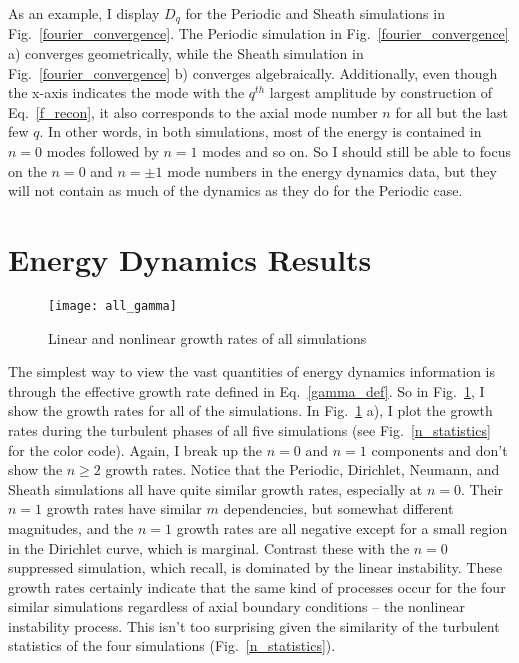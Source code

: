 As an example, I display $D_q$ for the Periodic and Sheath simulations in Fig.~\ref{fourier_convergence}. The Periodic simulation in Fig.~\ref{fourier_convergence} a) converges geometrically,
while the Sheath simulation in Fig.~\ref{fourier_convergence} b) converges algebraically. Additionally, even though the x-axis indicates the mode with the $q^{th}$ largest amplitude
by construction of Eq.~\ref{f_recon}, it also corresponds to the axial mode number $n$ for all but the last few $q$. In other words, in both simulations, most of the energy is contained
in $n=0$ modes followed by $n=1$ modes and so on. So I should still be able to focus on the $n=0$ and $n = \pm 1$ mode numbers in the energy dynamics data, but they will not contain as much
of the dynamics as they do for the Periodic case.



\section{Energy Dynamics Results}
\label{s_nonper_en_dyn}

\begin{figure}
\centerline{\texttt{[image: all\_gamma]}}
\caption{Linear and nonlinear growth rates of all simulations}
\label{all_gamma}
\end{figure}

The simplest way to view the vast quantities of energy dynamics information is through the effective growth rate defined in Eq.~\ref{gamma_def}. So in Fig.~\ref{all_gamma}, I show the growth
rates for all of the simulations. In Fig.~\ref{all_gamma} a), I plot the growth rates during the turbulent phases of all five simulations (see Fig.~\ref{n_statistics} for the color code).
Again, I break up the $n=0$ and $n=1$ components and don't show the $n \ge 2$ growth rates. Notice that the Periodic, Dirichlet, Neumann, and Sheath simulations all have quite similar growth
rates, especially at $n=0$. Their $n=1$ growth rates have similar $m$ dependencies, but somewhat different magnitudes, and the $n=1$ growth rates are all negative except for a small region
in the Dirichlet curve, which is marginal. Contrast these with the $n=0$ suppressed simulation, which recall, is dominated by the linear instability. These growth rates certainly indicate
that the same kind of processes occur for the four similar simulations regardless of axial boundary conditions -- the nonlinear instability process. This isn't too surprising given
the similarity of the turbulent statistics of the four simulations (Fig.~\ref{n_statistics}).

